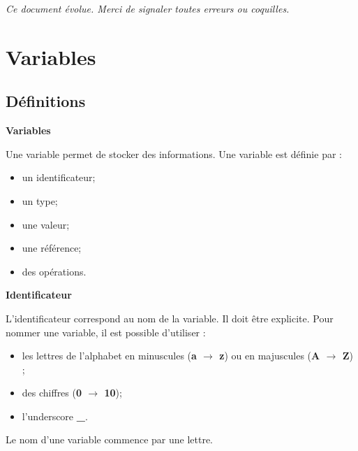 \documentclass[11pt,oneside]{article}
\begin{document}
\textit{Ce document évolue. Merci de signaler toutes erreurs ou coquilles.}


\section{Variables}

\subsection{Définitions}
\begin{defi}
\textbf{Variables}

Une variable permet de stocker des informations. Une variable est définie par : 
\begin{itemize}
\item un identificateur;
\item un type;
\item une valeur;
\item une référence;
\item des opérations. 
\end{itemize}
\end{defi}



\begin{defi}
\textbf{Identificateur}

L'identificateur correspond au nom de la variable. Il doit être explicite. Pour nommer une variable, il est possible d'utiliser :
\begin{itemize}
\item les lettres de l'alphabet en minuscules (\textbf{a $\rightarrow$ z}) ou en majuscules (\textbf{A $\rightarrow$ Z}) ;
\item des chiffres (\textbf{0 $\rightarrow$ 10});
\item l'underscore \textbf{\_}.
\end{itemize}

Le nom d'une variable commence par une lettre.

\end{defi}

\end{document}
